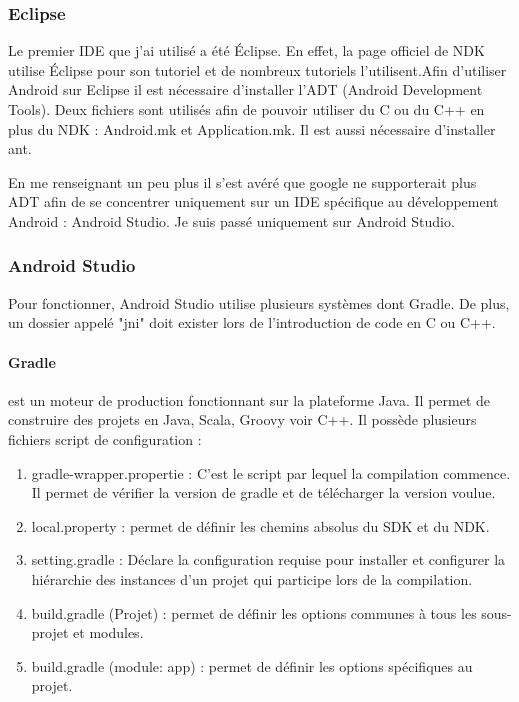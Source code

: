 \documentclass[a4paper,12pt]{article}
\begin{document}
 	\subsubsection{Eclipse}
 Le premier IDE que j'ai utilisé a été Éclipse. En effet, la page officiel de NDK \cite{ndk2} utilise Éclipse pour son tutoriel et de nombreux tutoriels l'utilisent.Afin d'utiliser Android sur Eclipse il est nécessaire d'installer l'ADT (Android Development Tools). Deux fichiers sont utilisés afin de pouvoir utiliser du C ou du C++ en plus du NDK : Android.mk et Application.mk. Il est aussi nécessaire d'installer ant.
 
 En me renseignant un peu plus il s'est avéré que google ne supporterait plus ADT afin de se concentrer uniquement sur un IDE spécifique au développement Android : Android Studio. Je suis passé uniquement sur Android Studio.
 
 	\subsubsection{Android Studio}
 	Pour fonctionner, Android Studio utilise plusieurs systèmes dont Gradle. De plus, un dossier appelé "jni" doit exister lors de l'introduction de code en C ou C++. 
\paragraph{Gradle} est un moteur de production fonctionnant sur la plateforme Java. Il permet de construire des projets en Java, Scala, Groovy voir C++. Il possède plusieurs fichiers script de configuration : 
 	
 	\begin{enumerate}
 	\item gradle-wrapper.propertie : C'est le script par lequel la compilation commence. Il permet de vérifier la version de gradle et de télécharger la version voulue.
 	\item local.property : permet de définir les chemins absolus du SDK et du NDK.  
 	\item setting.gradle : Déclare la configuration requise pour installer et configurer la hiérarchie des instances d'un projet qui participe lors de la compilation.
 	\item build.gradle (Projet) : permet de définir les options communes à tous les sous-projet et modules.
 	\item build.gradle (module: app) : permet de définir les options spécifiques au projet.
 	\end{enumerate}
\end{document}
